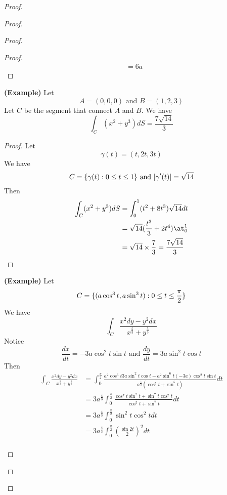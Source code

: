 \documentclass{report}
\begin{document}
\begin{proof}
\begin{proof}
\begin{proof}
\begin{proof}
\begin{align}
&=6a
\end{align}
\end{proof}
\begin{theorem}
\label{7.1.6}
\textbf{(Example)} Let 
\begin{equation}
A=(0,0,0)\text{ and }B=(1,2,3)
\end{equation}
Let $C$ be the segment that connect  $A$ and  $B$. We have
\begin{equation}
\int_C (x^2+y^3)dS=\frac{7\sqrt{14} }{3}
\end{equation}
\end{theorem}
\begin{proof}
Let 
\begin{equation}
\gamma (t)=(t,2t,3t)
\end{equation}
We have
\begin{equation}
C=\{ \gamma (t):0\leq t\leq 1 \}\text{ and }|\gamma '(t)|=\sqrt{14} 
\end{equation}
Then
\begin{align}
\int_C (x^2+y^3)dS&=\int_0^1 (t^2+8t^3)\sqrt{14}dt\\
&=\sqrt{14}(\frac{t^3}{3}+2t^4) \at_{0}^1\\
&=\sqrt{14} \times \frac{7}{3} =\frac{7\sqrt{14} }{3}
\end{align}
\end{proof}
\begin{theorem}
\label{7.1.7}
\textbf{(Example)} Let
\begin{equation}
C=\{ (a\cos^3 t,a\sin^3 t):0\leq t\leq \frac{\pi}{2} \}
\end{equation}
We have
\begin{equation}
\int_C \frac{x^2dy-y^2dx }{x^{\frac{5}{3}}+y^{\frac{5}{3}}}
\end{equation}
Notice
\begin{equation}
\frac{dx}{dt}=-3a\cos^2 t \sin t\text{ and }\frac{dy}{dt}=3a\sin^2 t\cos t
\end{equation}
Then
\begin{align}
  \int_C \frac{x^2dy-y^2dx}{x^{\frac{5}{3}}+y^{\frac{5}{3}}}&=\int_0^{\frac{\pi}{2}}\frac{a^2\cos^6 t 3a \sin^2 t \cos t-a^2 \sin^6 t (-3a)\cos ^2 t \sin t}{a^{\frac{5}{3}}(\cos^5 t+\sin^5 t)}dt\\
  &=3a^{\frac{4}{3}}\int_0^{\frac{\pi}{2}} \frac{\cos^7 t \sin^2 t+ \sin^7 t \cos^2 t}{\cos^5 t+ \sin^5 t}dt\\
  &=3a^{\frac{4}{3}}\int_0^{\frac{\pi}{2}}\sin^2 t \cos^2 t dt\\
  &=3a^{\frac{4}{3}}\int_0^{\frac{\pi}{2}} (\frac{\sin 2t}{2})^2 dt\\

\end{align}
\end{theorem}
\end{proof}
\end{proof}
\end{proof}
\end{document}
